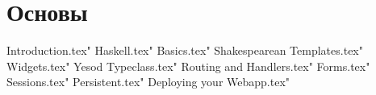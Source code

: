 
\part{Основы}

 Introduction.tex"
 Haskell.tex"
 Basics.tex"
 Shakespearean Templates.tex"
 Widgets.tex"
 Yesod Typeclass.tex"
 Routing and Handlers.tex"
 Forms.tex"
 Sessions.tex"
 Persistent.tex"
 Deploying your Webapp.tex"
